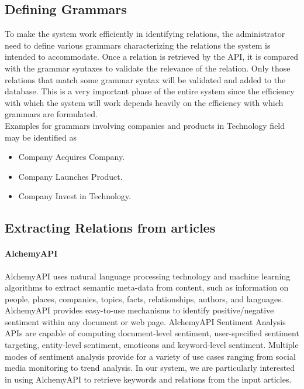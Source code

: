 \subsection{Defining Grammars}
\par To make the system work efficiently in identifying relations, the administrator need to define various grammars characterizing the relations the system is intended to accommodate. Once a relation is retrieved by the API, it is compared with the grammar syntaxes to validate the relevance of the relation. Only those relations that match some grammar syntax will be validated and added to the database. This is a very important phase of the entire system since the efficiency with which the system will work depends heavily on the efficiency with which grammars are formulated.
\\
Examples for grammars involving companies and products in Technology field may be identified as
\begin{itemize}
\item Company Acquires Company.
\item Company Launches Product.
\item Company Invest in Technology.
\end{itemize}

\subsection{Extracting Relations from articles}

\paragraph*{AlchemyAPI}
\hfill \break
AlchemyAPI uses natural language processing technology and machine learning 	algorithms to extract semantic meta-data from content, such as information on people, 	places, companies, topics, facts, relationships, authors, and languages. AlchemyAPI 	provides easy-to-use mechanisms to identify positive/negative sentiment within any 	document or web page. AlchemyAPI Sentiment Analysis APIs are capable of computing 	document-level sentiment, user-specified sentiment targeting, entity-level sentiment, 	emoticons and keyword-level sentiment. Multiple modes of sentiment analysis provide 	for a variety of use cases ranging from social media monitoring to trend analysis. In our system, we are particularly interested in using AlchemyAPI to retrieve keywords and relations from the input articles.\cite{alchemy-relation}


